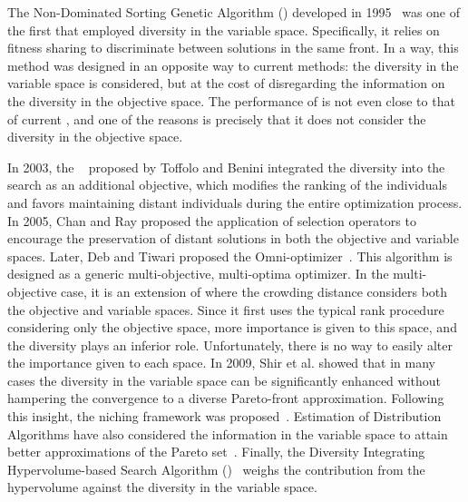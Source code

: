 The Non-Dominated Sorting Genetic Algorithm (\NSGA{}) developed in 1995~\cite{srinivas1994muiltiobjective} 
was one of the first \MOEAS{} that employed diversity in the variable space.
%
Specifically, it relies on fitness sharing to discriminate between solutions in the same front.
%
%
In a way, this method was designed in an opposite way to current methods: the diversity
in the variable space is considered, but at the cost of disregarding the information on the diversity
in the objective space.
%
The performance of \NSGA{} is not even close to that of current \MOEAS{}, and one 
of the reasons is precisely that it does not consider the diversity in the objective space.

In 2003, the \GDEA{}~\cite{toffolo2003genetic} proposed by Toffolo and Benini integrated the diversity into the search 
as an additional objective, which modifies the ranking of the individuals and favors maintaining distant individuals
during the entire optimization process.
%
In 2005, Chan and Ray \cite{chan2005evolutionary} proposed the application of selection operators to
encourage the preservation of distant solutions in both the objective and variable spaces.
%
%
Later, Deb and Tiwari proposed the Omni-optimizer~\cite{deb2008omni}.
%
This algorithm is designed as a generic multi-objective, multi-optima optimizer. %
%
In the multi-objective case, it is an extension of \NSGAII{} where the crowding distance considers both the objective and variable spaces.
%
Since it first uses the typical rank procedure considering only the objective space, more importance is given to this space, 
and the diversity plays an inferior role.
%
Unfortunately, there is no way to easily alter the importance given to each space.
%
In 2009, Shir et al. showed that in many cases the diversity in the variable space can be significantly enhanced without hampering 
the convergence to a diverse Pareto-front approximation.
%
Following this insight, the \CMAES{} niching framework was proposed~\cite{shir2009enhancing}.
%
Estimation of Distribution Algorithms have also considered the information in the variable space
to attain better approximations of the Pareto set~\cite{zhou2009approximating}.
%
Finally, the Diversity Integrating Hypervolume-based Search Algorithm (\DIVA{})~\cite{ulrich2010integrating}
weighs the contribution from the hypervolume against the diversity in the variable space.


